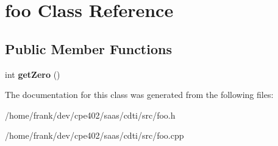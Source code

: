 \hypertarget{classfoo}{}\section{foo Class Reference}
\label{classfoo}
\subsection*{Public Member Functions}
\begin{DoxyCompactItemize}
\item 
\hypertarget{classfoo_a86a78c0e319fbd776c8355cfb6103bd4}{}int {\bfseries get\+Zero} ()\label{classfoo_a86a78c0e319fbd776c8355cfb6103bd4}

\end{DoxyCompactItemize}


The documentation for this class was generated from the following files\+:\begin{DoxyCompactItemize}
\item 
/home/frank/dev/cpe402/saas/cdti/src/foo.\+h\item 
/home/frank/dev/cpe402/saas/cdti/src/foo.\+cpp\end{DoxyCompactItemize}

